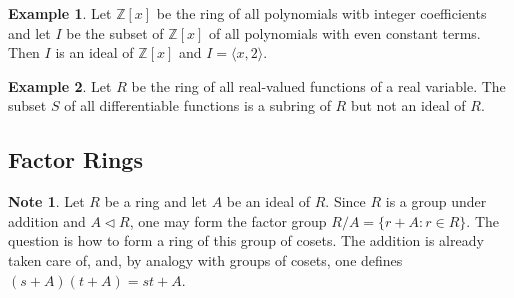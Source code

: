 \documentclass{article}
\newtheorem{theorem}{Theorem}[section]
\theoremstyle{definition}
\newtheorem{example}{Example}[section]
\newtheorem{note}{Note}[section]
\begin{document}
\begin{example}
    Let $\mathbb{Z}[x]$ be the ring of all polynomials witb integer coefficients and let $I$ be the subset of $\mathbb{Z}[x]$ of all polynomials with even constant terms. Then $I$ is an ideal of $\mathbb{Z}[x]$ and $I=\langle x,2 \rangle$.
\end{example}

\begin{example}
    Let $R$ be the ring of all real-valued functions of a real variable. The subset $S$ of all differentiable functions is a subring of $R$ but not an ideal of $R$.
\end{example}

\subsection{Factor Rings}
\begin{note}
    Let $R$ be a ring and let $A$ be an ideal of $R$. Since $R$ is a group under addition and $A \lhd R$, one may form the factor group $R/A=\{r+A:r\in R\}$. The question is how to form a ring of this group of cosets. The addition is already taken care of, and, by analogy with groups of cosets, one defines $(s+A)(t+A)=st+A$.
\end{note}

\noindent{}
\end{document}
